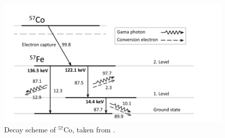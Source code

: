 \begin{figure}[H]
 \centering
 \includegraphics[scale=0.75, angle = 0]{./pictures/Fe57}
 \caption{Decay scheme of $^{57}$Co, taken from \cite{NOVAK2016thesis}.}
 \label{Fe57scheme}
 
\end{figure}

